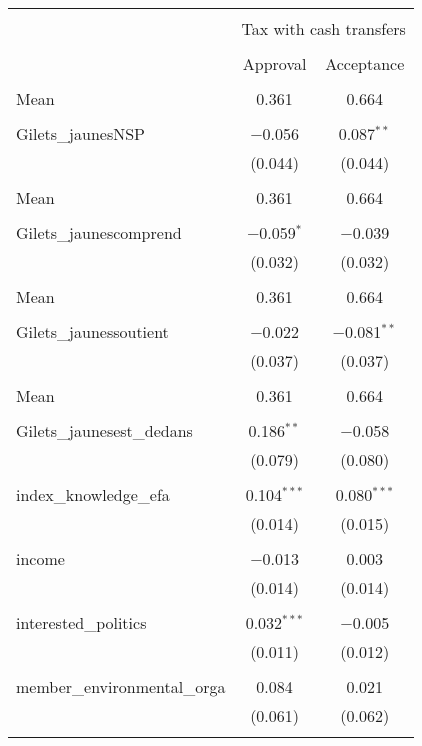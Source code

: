 
\begin{tabular}{@{\extracolsep{5pt}}lcc} 
\\[-1.8ex]\hline 
\hline \\[-1.8ex] 
 & \multicolumn{2}{c}{Tax with cash transfers} \\ 
\cline{2-3} 
\\[-1.8ex] & Approval & Acceptance \\ 
\hline \\[-1.8ex] 
 Mean & 0.361 & 0.664  \\ \hline \\[-1.8ex] Gilets\_jaunesNSP & $-$0.056 & 0.087$^{**}$ \\ 
  & (0.044) & (0.044) \\ 
  & & \\ 
 Mean & 0.361 & 0.664  \\ \hline \\[-1.8ex] Gilets\_jaunescomprend & $-$0.059$^{*}$ & $-$0.039 \\ 
  & (0.032) & (0.032) \\ 
  & & \\ 
 Mean & 0.361 & 0.664  \\ \hline \\[-1.8ex] Gilets\_jaunessoutient & $-$0.022 & $-$0.081$^{**}$ \\ 
  & (0.037) & (0.037) \\ 
  & & \\ 
 Mean & 0.361 & 0.664  \\ \hline \\[-1.8ex] Gilets\_jaunesest\_dedans & 0.186$^{**}$ & $-$0.058 \\ 
  & (0.079) & (0.080) \\ 
  & & \\ 
 index\_knowledge\_efa & 0.104$^{***}$ & 0.080$^{***}$ \\ 
  & (0.014) & (0.015) \\ 
  & & \\ 
 income & $-$0.013 & 0.003 \\ 
  & (0.014) & (0.014) \\ 
  & & \\ 
 interested\_politics & 0.032$^{***}$ & $-$0.005 \\ 
  & (0.011) & (0.012) \\ 
  & & \\ 
 member\_environmental\_orga & 0.084 & 0.021 \\ 
  & (0.061) & (0.062) \\ 
  & & \\ 

\end{tabular}
